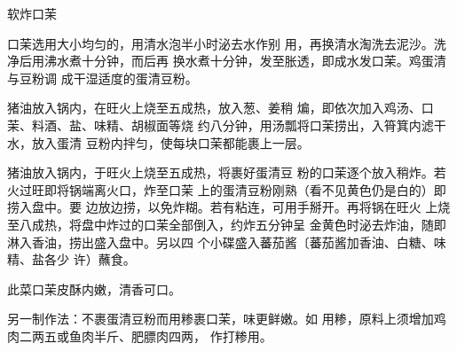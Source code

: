 \begin{recipe}{软炸口茉}

\ingredients



\cooking

\step 	口茉选用大小均匀的，用清水泡半小时泌去水作别 用，再换清水淘洗去泥沙。洗净后用沸水煮十分钟，而后再 换水煮十分钟，发至胀透，即成水发口茉。鸡蛋清与豆粉调 成干湿适度的蛋清豆粉。

\step 	猪油放入锅内，在旺火上烧至五成热，放入葱、姜稍 煸，即依次加入鸡汤、口茉、料酒、盐、味精、胡椒面等烧 约八分钟，用汤瓢将口茉捞出，入筲箕内滤干水，放入蛋清 豆粉内拌匀，使每块口茉都能裹上一层。

\step 	猪油放入锅内，于旺火上烧至五成热，将裹好蛋清豆 粉的口茉逐个放入稍炸。若火过旺即将锅端离火口，炸至口茉 上的蛋清豆粉刚熟（看不见黄色仍是白的）即捞入盘中。要 边放边捞，以免炸糊。若有粘连，可用手掰开。再将锅在旺火 上烧至八成热，将盘中炸过的口茉全部倒入，约炸五分钟呈 金黄色时泌去炸油，随即淋入香油，捞出盛入盘中。另以四 个小碟盛入蕃茄酱〔蕃茄酱加香油、白糖、味精、盐各少 许）蘸食。

\notes

此菜口茉皮酥内嫩，清香可口。

另一制作法：不裹蛋清豆粉而用糁裹口茉，味更鲜嫩。如 用糁，原料上须增加鸡肉二两五或鱼肉半斤、肥膘肉四两， 作打糁用。

\end{recipe}

